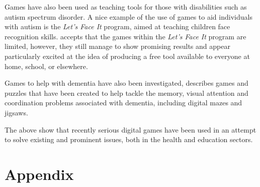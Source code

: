 \documentclass[journal]{IEEEtran}
\begin{document}
Games have also been used as teaching tools for those with disabilities such as autism spectrum disorder. A nice example of the use of games to aid individuals with autism is the \emph{Let's Face It} program, aimed at teaching children face recognition skills\cite{faceit}. \cite{faceit} accepts that the games within the \emph{Let's Face It} program are limited, however, they still manage to show promising results and appear particularly excited at the idea of producing a free tool available to everyone at home, school, or elsewhere. 

Games to help with dementia have also been investigated,
\cite{dementia} describes games and puzzles that have been created to help tackle the memory, visual attention and coordination problems associated with dementia, including digital mazes and jigsaws.

The above show that recently serious digital games have been used in an attempt to solve existing and prominent issues, both in the health and education sectors.


\section{Appendix}
\end{document}
